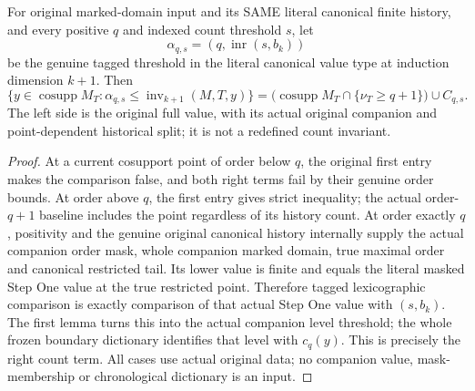 \begin{theorem}
\label{hir:original-positive-canonical-companion-count-threshold-whole-dictionary}
\leanok
{}
For original marked-domain input and its SAME literal canonical finite
history, and every positive $q$ and indexed count threshold $s$, let
\[
 \alpha_{q,s}=(q,\operatorname{inr}(s,b_k))
\]
be the genuine tagged threshold in the literal canonical value type at
induction dimension $k+1$. Then
\[
 \{y\in\operatorname{cosupp}M_T:
       \alpha_{q,s}\le\operatorname{inv}_{k+1}(M,T,y)\}
 =\bigl(\operatorname{cosupp}M_T\cap\{\nu_T\ge q+1\}\bigr)\cup C_{q,s}.
\]
The left side is the original full value, with its actual original companion
and point-dependent historical split; it is not a redefined count invariant.
\end{theorem}
\begin{proof}
At a current cosupport point of order below $q$, the original first entry
makes the comparison false, and both right terms fail by their genuine
order bounds. At order above $q$, the first entry gives strict inequality;
the actual order-$q+1$ baseline includes the point regardless of its history
count. At order exactly $q$, positivity and the genuine original canonical
history internally supply the actual companion order mask, whole companion
marked domain, true maximal order and canonical restricted tail. Its lower
value is finite and equals the literal masked Step One value at the true
restricted point. Therefore tagged lexicographic comparison is exactly
comparison of that actual Step One value with $(s,b_k)$. The first lemma
turns this into the actual companion level threshold; the whole frozen
boundary dictionary identifies that level with $c_q(y)$. This is precisely
the right count term. All cases use actual original data; no companion
value, mask-membership or chronological dictionary is an input.
\end{proof}

